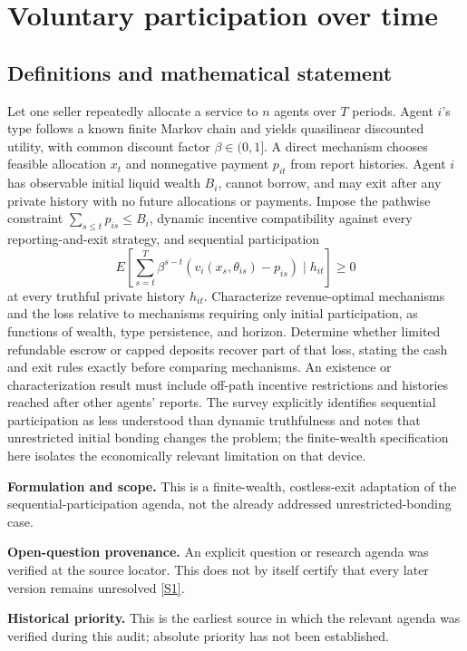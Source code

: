 \documentclass[11pt]{article}
\newcommand{\sref}[2]{\hyperlink{source:#1:#2}{[S#2]}}
\begin{document}
\section*{Voluntary participation over time}\label{30007573}
\subsection{Definitions and mathematical statement}
Let one seller repeatedly allocate a service to \(n\) agents over \(T\) periods. Agent \(i\)'s type follows a known finite Markov chain and yields quasilinear discounted utility, with common discount factor \(\beta\in(0,1]\). A direct mechanism chooses feasible allocation \(x_t\) and nonnegative payment \(p_{it}\) from report histories. Agent \(i\) has observable initial liquid wealth \(B_i\), cannot borrow, and may exit after any private history with no future allocations or payments. Impose the pathwise constraint \(\sum_{s\leq t}p_{is}\leq B_i\), dynamic incentive compatibility against every reporting-and-exit strategy, and sequential participation
\[
 E\left[\sum_{s=t}^{T}\beta^{s-t}
 (v_i(x_s,\theta_{is})-p_{is})\mid h_{it}\right]\geq0
\]
at every truthful private history \(h_{it}\). Characterize revenue-optimal mechanisms and the loss relative to mechanisms requiring only initial participation, as functions of wealth, type persistence, and horizon. Determine whether limited refundable escrow or capped deposits recover part of that loss, stating the cash and exit rules exactly before comparing mechanisms. An existence or characterization result must include off-path incentive restrictions and histories reached after other agents' reports. The survey explicitly identifies sequential participation as less understood than dynamic truthfulness and notes that unrestricted initial bonding changes the problem; the finite-wealth specification here isolates the economically relevant limitation on that device.

\par\textbf{Formulation and scope.} This is a finite-wealth, costless-exit adaptation of the sequential-participation agenda, not the already addressed unrestricted-bonding case.

\par\textbf{Open-question provenance.} An explicit question or research agenda was verified at the source locator. This does not by itself certify that every later version remains unresolved \sref{30007573}{1}.

\par\textbf{Historical priority.} This is the earliest source in which the relevant agenda was verified during this audit; absolute priority has not been established.
\end{document}
